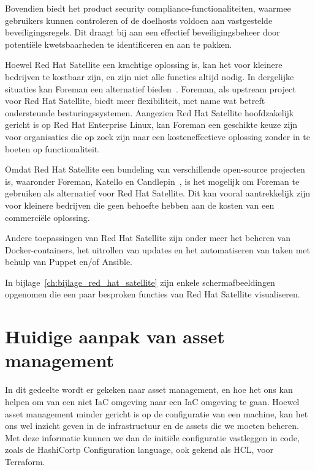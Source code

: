 Bovendien biedt het product security compliance-functionaliteiten, waarmee gebruikers kunnen controleren of de doelhosts voldoen aan vastgestelde beveiligingsregels.
Dit draagt bij aan een effectief beveiligingsbeheer door potentiële kwetsbaarheden te identificeren en aan te pakken.

Hoewel Red Hat Satellite een krachtige oplossing is, kan het voor kleinere bedrijven te kostbaar zijn, en zijn niet alle functies altijd nodig.
In dergelijke situaties kan Foreman een alternatief bieden~\autocite{foreman-introduction}.
Foreman, als upstream project voor Red Hat Satellite, biedt meer flexibiliteit, met name wat betreft ondersteunde besturingssystemen.
Aangezien Red Hat Satellite hoofdzakelijk gericht is op Red Hat Enterprise Linux, kan Foreman een geschikte keuze zijn voor organisaties die op zoek zijn naar een kosteneffectieve oplossing zonder in te boeten op functionaliteit.

Omdat Red Hat Satellite een bundeling van verschillende open-source projecten is, waaronder Foreman, Katello en Candlepin~\autocite{rhel-satellite-6-introduction}, is het mogelijk om Foreman te gebruiken als alternatief voor Red Hat Satellite.
Dit kan vooral aantrekkelijk zijn voor kleinere bedrijven die geen behoefte hebben aan de kosten van een commerciële oplossing.

Andere toepassingen van Red Hat Satellite zijn onder meer het beheren van Docker-containers, het uitrollen van updates en het automatiseren van taken met behulp van Puppet en/of Ansible.

In bijlage~\ref{ch:bijlage_red_hat_satellite} zijn enkele schermafbeeldingen opgenomen die een paar besproken functies van Red Hat Satellite visualiseren.

\section{Huidige aanpak van asset management}%
\label{sec:huidige-aanpak-van-asset-management}

In dit gedeelte wordt er gekeken naar asset management, en hoe het ons kan helpen om van een niet IaC omgeving naar een IaC omgeving te gaan.
Hoewel asset management minder gericht is op de configuratie van een machine, kan het ons wel inzicht geven in de infrastructuur en de assets die we moeten beheren.
Met deze informatie kunnen we dan de initi\"ele configuratie vastleggen in code, zoals de HashiCortp Configuration language, ook gekend als HCL, voor Terraform.

